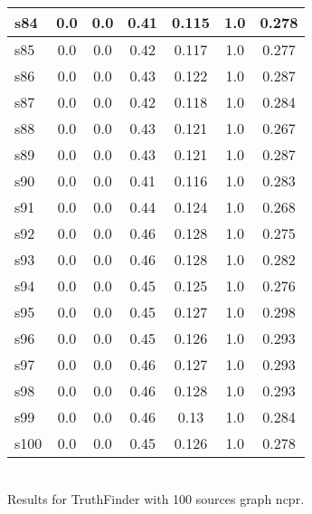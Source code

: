 \documentclass{article}
\begin{document}
\begin{tabular}{|l|c|c|c|c|c|c|}
s84 &0.0 & 0.0 & 0.41 & 0.115 & 1.0 & 0.278\\
\hline
s85 &0.0 & 0.0 & 0.42 & 0.117 & 1.0 & 0.277\\
\hline
s86 &0.0 & 0.0 & 0.43 & 0.122 & 1.0 & 0.287\\
\hline
s87 &0.0 & 0.0 & 0.42 & 0.118 & 1.0 & 0.284\\
\hline
s88 &0.0 & 0.0 & 0.43 & 0.121 & 1.0 & 0.267\\
\hline
s89 &0.0 & 0.0 & 0.43 & 0.121 & 1.0 & 0.287\\
\hline
s90 &0.0 & 0.0 & 0.41 & 0.116 & 1.0 & 0.283\\
\hline
s91 &0.0 & 0.0 & 0.44 & 0.124 & 1.0 & 0.268\\
\hline
s92 &0.0 & 0.0 & 0.46 & 0.128 & 1.0 & 0.275\\
\hline
s93 &0.0 & 0.0 & 0.46 & 0.128 & 1.0 & 0.282\\
\hline
s94 &0.0 & 0.0 & 0.45 & 0.125 & 1.0 & 0.276\\
\hline
s95 &0.0 & 0.0 & 0.45 & 0.127 & 1.0 & 0.298\\
\hline
s96 &0.0 & 0.0 & 0.45 & 0.126 & 1.0 & 0.293\\
\hline
s97 &0.0 & 0.0 & 0.46 & 0.127 & 1.0 & 0.293\\
\hline
s98 &0.0 & 0.0 & 0.46 & 0.128 & 1.0 & 0.293\\
\hline
s99 &0.0 & 0.0 & 0.46 & 0.13 & 1.0 & 0.284\\
\hline
s100 &0.0 & 0.0 & 0.45 & 0.126 & 1.0 & 0.278\\
\hline
\end{tabular}\\

\noindent Results for TruthFinder with 100 sources graph ncpr.
\end{document}
